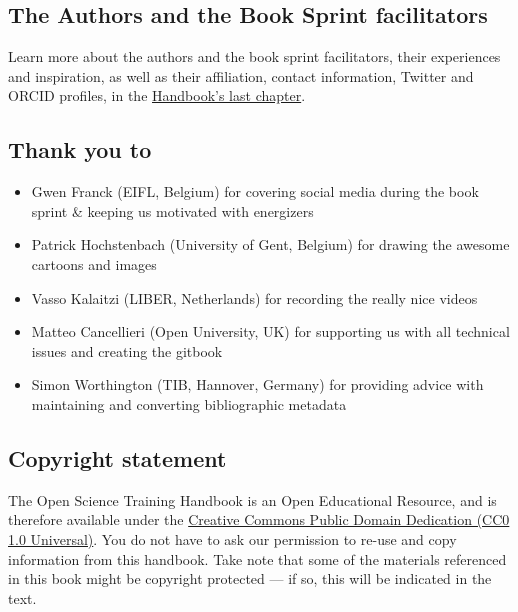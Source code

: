 \documentclass{article}
\begin{document}
\subsection{The Authors and the Book Sprint facilitators}\label{the-authors-and-the-book-sprint-facilitators}



Learn more about the authors and the book sprint facilitators, their experiences and inspiration, as well as their affiliation, contact information, Twitter and ORCID profiles, in the \href{https://book.fosteropenscience.eu/en/08AboutTheAuthorsAndFacilitators}{Handbook's last chapter}.


\subsection{Thank you to}\label{thank-you-to}


\begin{itemize}
\item Gwen Franck (EIFL, Belgium) for covering social media during the book sprint \& keeping us motivated with energizers


\item Patrick Hochstenbach (University of Gent, Belgium) for drawing the awesome cartoons and images


\item Vasso Kalaitzi (LIBER, Netherlands) for recording the really nice videos


\item Matteo Cancellieri (Open University, UK) for supporting us with all technical issues and creating the gitbook


\item Simon Worthington (TIB, Hannover, Germany) for providing advice with maintaining and converting bibliographic metadata


\end{itemize}

\subsection{Copyright statement}\label{copyright-statement}



The Open Science Training Handbook is an Open Educational Resource, and is therefore available under the \href{https://creativecommons.org/publicdomain/zero/1.0/}{Creative Commons Public Domain Dedication (CC0 1.0 Universal)}. You do not have to ask our permission to re-use and copy information from this handbook. Take note that some of the materials referenced in this book might be copyright protected — if so, this will be indicated in the text.
\end{document}
